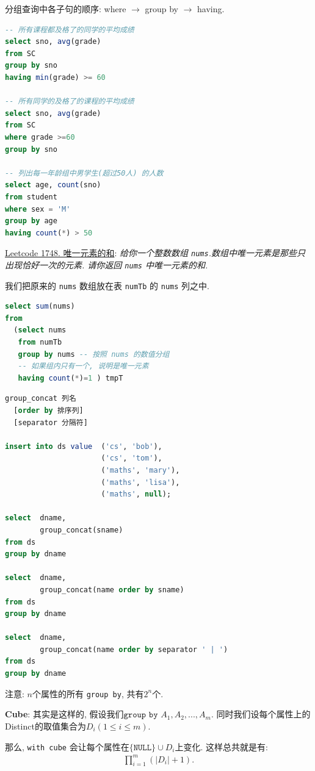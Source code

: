 分组查询中各子句的顺序: where $\to$ group by $\to$ having.
\begin{lstlisting}[language=SQL]
-- 所有课程都及格了的同学的平均成绩
select sno, avg(grade)
from SC
group by sno
having min(grade) >= 60

-- 所有同学的及格了的课程的平均成绩
select sno, avg(grade)
from SC
where grade >=60
group by sno

-- 列出每一年龄组中男学生(超过50人) 的人数
select age, count(sno)
from student
where sex = 'M'
group by age
having count(*) > 50
\end{lstlisting}

\hyperlink{https://leetcode.cn/problems/sum-of-unique-elements/description/}{Leetcode 1748. 唯一元素的和}: \textit{给你一个整数数组 \texttt{nums}.数组中唯一元素是那些只出现恰好一次的元素.
请你返回 \texttt{nums} 中唯一元素的和.}

我们把原来的 \verb|nums| 数组放在表 \verb|numTb| 的 \verb|nums| 列之中.
\begin{lstlisting}[language=SQL]
select sum(nums)
from
  (select nums
   from numTb
   group by nums -- 按照 nums 的数值分组
   -- 如果组内只有一个, 说明是唯一元素
   having count(*)=1 ) tmpT
\end{lstlisting}


\begin{lstlisting}[language=SQL]
group_concat 列名
  [order by 排序列]
  [separator 分隔符]

insert into ds value  ('cs', 'bob'),
                      ('cs', 'tom'),
                      ('maths', 'mary'),
                      ('maths', 'lisa'),
                      ('maths', null);

select  dname,
        group_concat(sname)
from ds
group by dname

select  dname,
        group_concat(name order by sname)
from ds
group by dname

select  dname,
        group_concat(name order by separator ' | ')
from ds
group by dname
\end{lstlisting}

注意: $n$个属性的所有 \verb|group by|, 共有$2^n$个.

\textbf{Cube}: 其实是这样的, 假设我们$\texttt{group by }A_1,A_2,...,A_m$. 同时我们设每个属性上的Distinct的取值集合为$D_i(1\leq i\leq m)$.

那么, \verb|with cube| 会让每个属性在$\{\texttt{NULL}\}\cup D_i$上变化. 这样总共就是有:
\begin{align*}
    \prod_{i=1}^m (|D_i|+1).
\end{align*}


